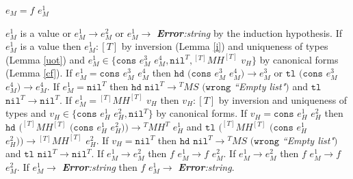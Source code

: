 \begin{case}
$e_{M}=f$ $e_{M}^{1}$

$e_{M}^{1}$ is a value or $e_{M}^{1}\rightarrow e_{M}^{2}$ or $e_{M}^{1}\rightarrow$ \emph{\textbf{Error}:\;string} by the induction hypothesis.  If $e_{M}^{1}$ is a value then $e_{M}^{1}:[T]$ by inversion (Lemma \ref{i}) and uniqueness of types (Lemma \ref{uot}) and $e_{M}^{1}\in\lbrace\mathtt{cons}$ $e_{M}^{3}$ $e_{M}^{4},\mathtt{nil}^{T},{^{[T]}M}H^{[T]}$ $v_{H}\rbrace$ by canonical forms (Lemma \ref{cf}).  If $e_{M}^{1}=\mathtt{cons}$ $e_{M}^{3}$ $e_{M}^{4}$ then $\mathtt{hd}$ $(\mathtt{cons}$ $e_{M}^{3}$ $e_{M}^{4})\rightarrow e_{M}^{3}$ or $\mathtt{tl}$ $(\mathtt{cons}$ $e_{M}^{3}$ $e_{M}^{4})\rightarrow e_{M}^{4}$.  If $e_{M}^{1}=\mathtt{nil}^{T}$ then $\mathtt{hd}$ $\mathtt{nil}^{T}\rightarrow{^{T}M}S$ $(\mathtt{wrong}$ \emph{``Empty list"}$)$ and $\mathtt{tl}$ $\mathtt{nil}^{T}\rightarrow\mathtt{nil}^{T}$.  If $e_{M}^{1}={^{[T]}M}H^{[T]}$ $v_{H}$ then $v_{H}:[T]$ by inversion and uniqueness of types and $v_{H}\in\lbrace\mathtt{cons}$ $e_{H}^{1}$ $e_{H}^{2},\mathtt{nil}^{T}\rbrace$ by canonical forms.  If $v_{H}=\mathtt{cons}$ $e_{H}^{1}$ $e_{H}^{2}$ then $\mathtt{hd}$ $(^{[T]}MH^{[T]}$ $(\mathtt{cons}$ $e_{H}^{1}$ $e_{H}^{2}))\rightarrow{^{T}M}H^{T}$ $e_{H}^{1}$ and $\mathtt{tl}$ $(^{[T]}MH^{[T]}$ $(\mathtt{cons}$ $e_{H}^{1}$ $e_{H}^{2}))\rightarrow{^{[T]}M}H^{[T]}$ $e_{H}^{2}$.  If $v_{H}=\mathtt{nil}^{T}$ then $\mathtt{hd}$ $\mathtt{nil}^{T}\rightarrow{^{T}M}S$ $(\mathtt{wrong}$ \emph{``Empty list"}$)$ and $\mathtt{tl}$ $\mathtt{nil}^{T}\rightarrow\mathtt{nil}^{T}$.  If $e_{M}^{1}\rightarrow e_{M}^{2}$ then $f$ $e_{M}^{1}\rightarrow f$ $e_{M}^{2}$.  If $e_{M}^{1}\rightarrow e_{M}^{2}$ then $f$ $e_{M}^{1}\rightarrow f$ $e_{M}^{2}$.  If $e_{M}^{1}\rightarrow$ \emph{\textbf{Error}:\;string} then $f$ $e_{M}^{1}\rightarrow$ \emph{\textbf{Error}:\;string}.
\end{case}